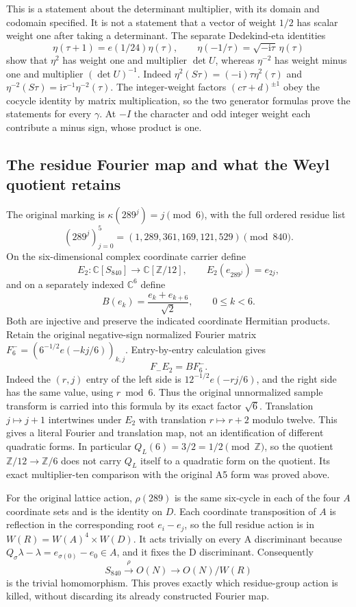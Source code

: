 This is a statement about the determinant multiplier, with its domain
and codomain specified.  It is not a statement that a vector of weight
$1/2$ has scalar weight one after taking a determinant.  The separate
Dedekind-eta identities
\[
 \eta(\tau+1)=e(1/24)\eta(\tau),\qquad
 \eta(-1/\tau)=\sqrt{-\mathrm i\tau}\,\eta(\tau)
\]
show that $\eta^2$ has weight one and multiplier $\det U$, whereas
$\eta^{-2}$ has weight minus one and multiplier $(\det U)^{-1}$.
Indeed $\eta^2(S\tau)=(-\mathrm i)\tau\eta^2(\tau)$ and
$\eta^{-2}(S\tau)=\mathrm i\tau^{-1}\eta^{-2}(\tau)$.
The integer-weight factors $(c\tau+d)^{\pm1}$ obey the cocycle identity
by matrix multiplication, so the two generator formulas prove the
statements for every $\gamma$.  At $-I$ the character and odd integer
weight each contribute a minus sign, whose product is one.

\subsection{The residue Fourier map and what the Weyl quotient retains}

The original marking is
$\kappa(289^j)=j\pmod6$, with the full ordered residue list
\[
 (289^j)_{j=0}^5=(1,289,361,169,121,529)\pmod{840}.
\]
On the six-dimensional complex coordinate carrier define
\[
 E_2:\mathbb C[S_{840}]\longrightarrow\mathbb C[\mathbb Z/12],
 \qquad E_2(e_{289^j})=e_{2j},
\]
and on a separately indexed $\mathbb C^6$ define
\[
 B(e_k)=\frac{e_k+e_{k+6}}{\sqrt2},\qquad0\le k<6.
\]
Both are injective and preserve the indicated coordinate Hermitian
products.  Retain the original negative-sign normalized Fourier matrix
$F_6^-=(6^{-1/2}e(-kj/6))_{k,j}$.  Entry-by-entry calculation gives
\[
 \boxed{F_-E_2=B F_6^-.}
\]
Indeed the $(r,j)$ entry of the left side is
$12^{-1/2}e(-rj/6)$, and the right side has the same value, using
$r\bmod6$.  Thus the original unnormalized sample transform is carried
into this formula by its exact factor $\sqrt6$.
Translation $j\mapsto j+1$ intertwines under $E_2$ with translation
$r\mapsto r+2$ modulo twelve.  This gives a literal Fourier and
translation map, not an identification of different quadratic forms.
In particular $Q_L(6)=3/2=1/2\pmod{\mathbb Z}$, so the quotient
$\mathbb Z/12\to\mathbb Z/6$ does not carry $Q_L$ itself to a
quadratic form on the quotient.  Its exact multiplier-ten comparison
with the original A5 form was proved above.

For the original lattice action, $\rho(289)$ is the same six-cycle in
each of the four $A$ coordinate sets and is the identity on $D$.
Each coordinate transposition of $A$ is reflection in the corresponding
root $e_i-e_j$, so the full residue action is in
$W(R)=W(A)^4\times W(D)$.  It acts trivially on every A discriminant
because
$Q_\sigma\lambda-\lambda=e_{\sigma(0)}-e_0\in A$, and it fixes
the D discriminant.  Consequently
\[
 S_{840}\xrightarrow{\rho}O(N)\longrightarrow O(N)/W(R)
\]
is the trivial homomorphism.  This proves exactly which residue-group
action is killed, without discarding its already constructed Fourier map.


